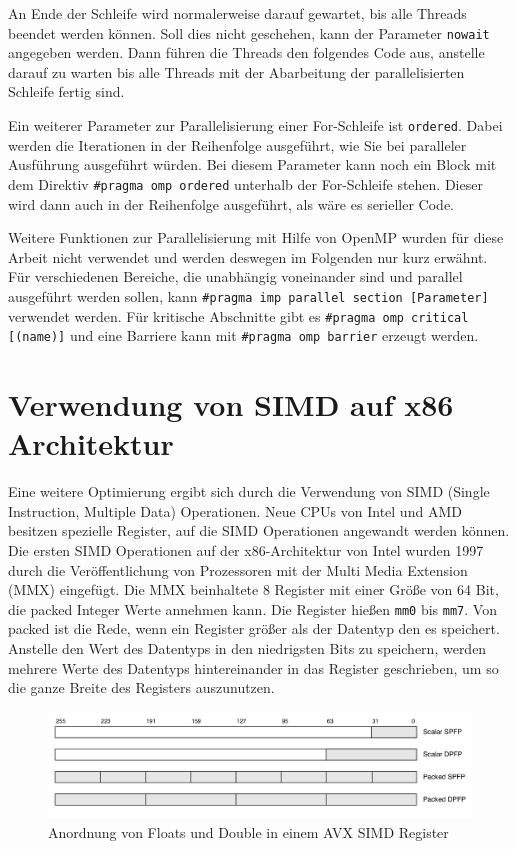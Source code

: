 \documentclass[../main.tex]{subfiles}
\begin{document}
An Ende der Schleife wird normalerweise darauf gewartet, bis alle Threads beendet werden können. Soll dies nicht geschehen, kann der Parameter \texttt{nowait} angegeben werden. Dann führen die Threads den folgendes Code aus, anstelle darauf zu warten bis alle Threads mit der Abarbeitung der parallelisierten Schleife fertig sind.

Ein weiterer Parameter zur Parallelisierung einer For-Schleife ist \texttt{ordered}. Dabei werden die Iterationen in der Reihenfolge ausgeführt, wie Sie bei paralleler Ausführung ausgeführt würden. Bei diesem Parameter kann noch ein Block mit dem Direktiv \texttt{\#pragma omp ordered} unterhalb der For-Schleife stehen. Dieser wird dann auch in der Reihenfolge ausgeführt, als wäre es serieller Code.

Weitere Funktionen zur Parallelisierung mit Hilfe von OpenMP wurden für diese Arbeit nicht verwendet und werden deswegen im Folgenden nur kurz erwähnt.
Für verschiedenen Bereiche, die unabhängig voneinander sind und parallel ausgeführt werden sollen, kann \texttt{\#pragma imp parallel section [Parameter]} verwendet werden.
Für kritische Abschnitte gibt es \texttt{\#pragma omp critical [(name)]} und eine Barriere kann mit \texttt{\#pragma omp barrier} erzeugt werden.

\section{Verwendung von SIMD auf x86 Architektur}

Eine weitere Optimierung ergibt sich durch die Verwendung von SIMD (Single Instruction, Multiple Data) Operationen.  Neue CPUs von Intel und AMD besitzen spezielle Register, auf die SIMD Operationen angewandt werden können. 
Die ersten SIMD Operationen auf der x86-Architektur von Intel wurden 1997 durch die Veröffentlichung von Prozessoren mit der Multi Media Extension (MMX) eingefügt. Die MMX beinhaltete 8 Register mit einer Größe von 64 Bit, die packed Integer Werte annehmen kann. Die Register hießen \texttt{mm0} bis \texttt{mm7}.
Von packed ist die Rede, wenn ein Register größer als der Datentyp den es speichert. Anstelle den Wert des Datentyps in den niedrigsten Bits zu speichern, werden mehrere Werte des Datentyps hintereinander in das Register geschrieben, um so die ganze Breite des Registers auszunutzen.

\begin{figure}[!htbp]
	\centering
	\includegraphics[width=\textwidth]{../images/Benz/avx_packed_scalar.png}
	\caption{Anordnung von Floats und Double in einem AVX SIMD Register} 
	\label{fig:avx_packed_scalar}
\end{figure}
\end{document}
